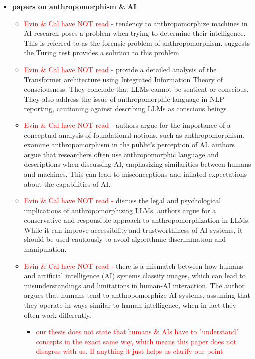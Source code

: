 \documentclass{article}
\begin{document}
\begin{itemize}
    \item \textbf{papers on anthropomorphism \& AI}
    \begin{itemize}
        \item \textcolor{red}{Evin \& Cal have NOT read - } \cite{proudfoot2011anthropomorphism} tendency to anthropomorphize machines in AI research poses a problem when trying to determine their intelligence. This is referred to as the forensic problem of anthropomorphism. suggests the Turing test provides a solution to this problem
        \item \textcolor{red}{Evin \& Cal have NOT read - } \cite{shardlow2022deanthropomorphising} provide a detailed analysis of the Transformer architecture using Integrated Information Theory of consciousness. They conclude that LLMs cannot be sentient or conscious. They also address the issue of anthropomorphic language in NLP reporting, cautioning against describing LLMs as conscious beings
        \item \textcolor{red}{Evin \& Cal have NOT read - } \cite{salles2020anthropomorphism} authors argue for the importance of a conceptual analysis of foundational notions, such as anthropomorphism. examine anthropomorphism in the public's perception of AI. authors argue that researchers often use anthropomorphic language and descriptions when discussing AI, emphasizing similarities between humans and machines. This can lead to misconceptions and inflated expectations about the capabilities of AI.
        \item \textcolor{red}{Evin \& Cal have NOT read - } \cite{deshpande2023anthropomorphization} discuss the legal and psychological implications of anthropomorphizing LLMs. authors argue for a conservative and responsible approach to anthropomorphization in LLMs. While it can improve accessibility and trustworthiness of AI systems, it should be used cautiously to avoid algorithmic discrimination and manipulation.
        \item \textcolor{red}{Evin \& Cal have NOT read - } \cite{mueller2020cognitive} there is a mismatch between how humans and artificial intelligence (AI) systems classify images, which can lead to misunderstandings and limitations in human-AI interaction. The author argues that humans tend to anthropomorphize AI systems, assuming that they operate in ways similar to human intelligence, when in fact they often work differently.
        \begin{itemize}
            \item \textcolor{red}{our thesis does not state that humans \& AIs have to "understand" concepts in the exact same way, which means this paper does not disagree with us. If anything it just helps us clarify our point}

\end{itemize}
\end{itemize}
\end{itemize}
\end{document}
